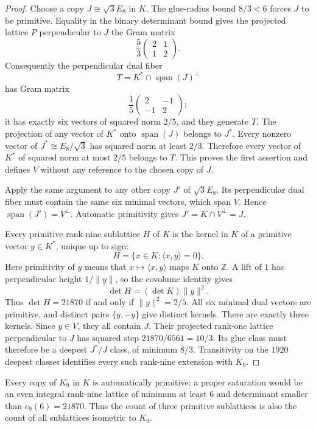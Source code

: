 \documentclass[11pt,a4paper]{article}
\theoremstyle{remark}\newtheorem{remark}[theorem]{Remark}
\begin{document}
\begin{proof}
Choose a copy $J\cong\sqrt3E_8$ in $K$. The glue-radius bound $8/3<6$
forces $J$ to be primitive. Equality in the binary determinant bound gives
the projected lattice $P$ perpendicular to $J$ the Gram matrix
\[
 \frac53\begin{pmatrix}2&1\\1&2\end{pmatrix}.
\]
Consequently the perpendicular dual fiber
\[
 T=K^*\cap\operatorname{span}(J)^\perp
\]
has Gram matrix
\[
 \frac15\begin{pmatrix}2&-1\\-1&2\end{pmatrix};
\]
it has exactly six vectors of squared norm $2/5$, and they generate $T$.
The projection of any vector of $K^*$ onto $\operatorname{span}(J)$
belongs to $J^*$. Every nonzero vector of $J^*\cong E_8/\sqrt3$ has
squared norm at least $2/3$. Therefore every vector of $K^*$ of squared norm at most
$2/5$ belongs to $T$. This proves the first assertion and defines $V$
without any reference to the chosen copy of $J$.

Apply the same argument to any other copy $J'$ of $\sqrt3E_8$.
Its perpendicular dual fiber must contain the same six minimal vectors,
which span $V$. Hence $\operatorname{span}(J')=V^\perp$.
Automatic primitivity gives $J'=K\cap V^\perp=J$.

Every primitive rank-nine sublattice $H$ of $K$ is the kernel in $K$
of a primitive vector $y\in K^*$, unique up to sign:
\[
 H=\{x\in K:\langle x,y\rangle=0\}.
\]
Here primitivity of $y$ means that $x\mapsto\langle x,y\rangle$
maps $K$ onto $\mathbb Z$. A lift of $1$ has perpendicular height
$1/\|y\|$, so the covolume identity gives
\[
 \det H=(\det K)\|y\|^2.
\]
Thus $\det H=21870$ if and only if $\|y\|^2=2/5$.
All six minimal dual vectors are primitive, and distinct pairs
$\{y,-y\}$ give distinct kernels. There are exactly three kernels.
Since $y\in V$, they all contain $J$. Their projected rank-one lattice
perpendicular to $J$ has squared step
$21870/6561=10/3$. Its glue class must therefore be a deepest
$J^*/J$ class, of minimum $8/3$. Transitivity on the $1920$ deepest
classes identifies every such rank-nine extension with $K_9$.
\end{proof}

Every copy of $K_9$ in $K$ is automatically primitive: a proper saturation would be an even integral rank-nine lattice of minimum at least 6 and determinant smaller than $e_9(6)=21870$. Thus the count of three primitive sublattices is also the count of all sublattices isometric to $K_9$.
\end{document}
